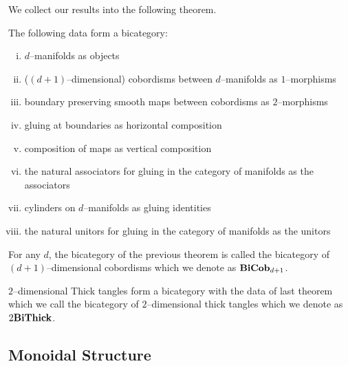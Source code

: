 \documentclass[./Thick_TQFTs_and_Quantum_Information.tex]{subfiles}
\begin{document}
We collect our results into the following theorem.
\begin{thm}
The following data form a bicategory:
\begin{enumerate}[(i)]
\setlength{\itemsep}{0pt}
\item $d$--manifolds as objects
\item ($(d + 1)$--dimensional) cobordisms between $d$--manifolds as
$1$--morphisms
\item boundary preserving smooth maps between cobordisms as $2$--morphisms
\item gluing at boundaries as horizontal composition
\item composition of maps as vertical composition
\item the natural associators for gluing in the category of manifolds as the
associators
\item cylinders on $d$--manifolds as gluing identities
\item the natural unitors for gluing in the category of manifolds as the unitors
\end{enumerate}
\end{thm}

\begin{defn}
For any $d$, the bicategory of the previous theorem is called the bicategory of
$(d + 1)$--dimensional cobordisms which we denote as $\textbf{BiCob}_{d + 1}$.
\end{defn}

\begin{defn}
$2$--dimensional Thick tangles form a bicategory with the data of last theorem
which we call the bicategory of $2$--dimensional thick tangles which we denote
as $2\textbf{BiThick}$.
\end{defn}

\subsection{Monoidal Structure}
\end{document}
